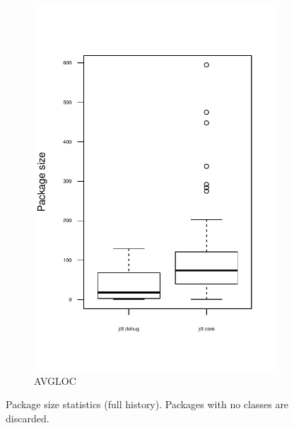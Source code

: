 \begin{figure}
        \begin{subfigure}[b]{0.48\textwidth}
                \centering
                \includegraphics[width=\textwidth]{img/package-size-avgloc.pdf}
                \caption{AVGLOC}
        \end{subfigure}
		\caption{Package size statistics (full history). Packages with no classes are discarded.}
		\label{fig:package-stats}
\end{figure}

